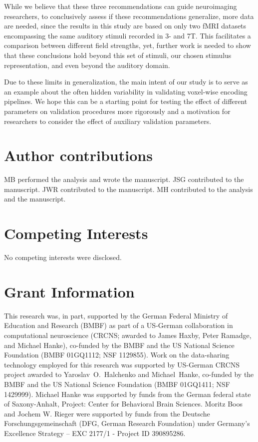While we believe that these three recommendations can guide neuroimaging researchers, to conclusively assess if these recommendations generalize, more data are needed, since the results in this study are based on only two f{MRI} datasets encompassing the same auditory stimuli recorded in 3- and 7T. This facilitates a comparison between different field strengths, yet, further work is needed to show that these conclusions hold beyond this set of stimuli, our chosen stimulus representation, and even beyond the auditory domain.

Due to these limits in generalization, the main intent of our study is to serve as an example about the often hidden variability in validating voxel-wise encoding pipelines.
We hope this can be a starting point for testing the effect of different parameters on validation procedures more rigorously and a motivation for researchers to consider the effect of auxiliary validation parameters.

\section*{Author contributions}

MB performed the analysis and wrote the manuscript.
JSG contributed to the manuscript.
JWR contributed to the manuscript.
MH contributed to the analysis and the manuscript.

\section*{Competing Interests}

No competing interests were disclosed.

\section*{Grant Information}

This research was, in part, supported by the German Federal Ministry of
Education and Research (BMBF) as part of a US-German collaboration in
computational neuroscience (CRCNS; awarded to James Haxby, Peter Ramadge, and
Michael Hanke), co-funded by the BMBF and the US National Science Foundation
(BMBF 01GQ1112; NSF 1129855).  Work on the data-sharing technology employed for
this research was supported by US-German CRCNS project awarded to
Yaroslav~O.~Halchenko and Michael~Hanke, co-funded by the BMBF and the US
National Science Foundation (BMBF 01GQ1411; NSF 1429999).  Michael Hanke was
supported by funds from the German federal state of Saxony-Anhalt, Project:
Center for Behavioral Brain Sciences.
Moritz Boos and Jochem W. Rieger were supported by funds from the Deutsche Forschungsgemeinschaft (DFG, German Research Foundation) under Germany's Excellence Strategy – EXC 2177/1 - Project ID 390895286.

